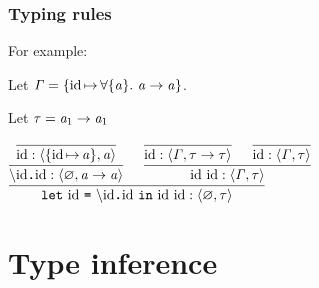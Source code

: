 \documentclass[12pt,red]{beamer}
\begin{document}
\begin{frame}
  \frametitle{Typing rules}

  For example:

  \vspace{0.1in}

  Let $\mathit{\Gamma}
  =\{\mbox{id}\,{\mapsto}\,\forall\{\mathit{a}\}.\ \mathit{a}\rightarrow\mathit{a}\}$.

  Let $\mathit{\tau}
  =\mathit{a}_1\rightarrow\mathit{a}_1$

  \begin{center}
    $\infer[]
    {\MEMtyping
      {\CONSsplet
        {\mbox{id}}
        {\CONSlamexp{\mbox{id}}{\mbox{id}}}
        {\CONSappexp{\mbox{id}}{\mbox{id}}}
      }
      {\emptyset}
      {\METAity}
    }
    {\infer[]
      {\MEMtyping
        {\CONSlamexp{\mbox{id}}{\mbox{id}}}
        {\emptyset}
        {\CONSarrowtyp{\METAtyvar}{\METAtyvar}}
      }
      {\infer[]
        {\MEMtyping
          {\mbox{id}}
          {\{\asgn{\mbox{id}}{\METAtyvar}\}}
          {\METAtyvar}
        }
        {}
      }
      &\infer[]
      {\MEMtyping
        {\CONSappexp{\mbox{id}}{\mbox{id}}}
        {\METAityenv}
        {\METAity}
      }
      {\infer[]
        {\MEMtyping
          {\mbox{id}}
          {\METAityenv}
          {\CONSarrowtyp{\METAity}{\METAity}}
        }
        {}
        &\infer[]
        {\MEMtyping
          {\mbox{id}}
          {\METAityenv}
          {\METAity}
        }
        {}
      }
    }$
  \end{center}
\end{frame}


\section{Type inference}
\end{document}
